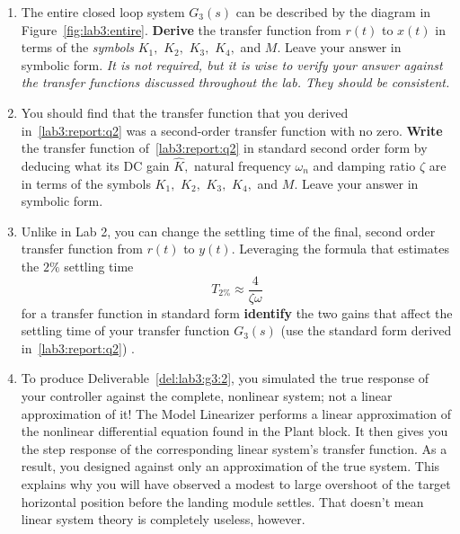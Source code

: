 \begin{deliverable}[label={lab3:report}]
  \begin{enumerate}[label={(\arabic*)}]
    \item{%
      The entire closed loop system \(G_3(s)\) can be described by the diagram in Figure~\ref{fig:lab3:entire}.
      \textbf{Derive} the transfer function from \(r(t)\) to \(x(t)\)
      in terms of the \emph{symbols} \(K_1,\) \(K_2,\) \(K_3,\) \(K_4,\) and \(M.\)
      Leave your answer in symbolic form.
      \emph{It is not required, but it is wise to verify your answer against the transfer functions discussed throughout the lab. They should be consistent.}
      \label{lab3:report:q1}
    }
    \item{%
      You should find that the transfer function that you derived in~\ref{lab3:report:q2} was a second-order transfer function with no zero.
      \textbf{Write} the transfer function of~\ref{lab3:report:q2} in standard second order form by deducing what its DC gain \(\hat{K},\) natural frequency \(\omega_n\) and damping ratio \(\zeta\) are in terms of the symbols \(K_1,\) \(K_2,\) \(K_3,\) \(K_4,\) and \(M.\)
      Leave your answer in symbolic form.
      \label{lab3:report:q2}
    }
    \item{%
      Unlike in Lab 2, you can change the settling time of the final, second order transfer function from \(r(t)\) to \(y(t).\)
      Leveraging the formula that estimates the \(2\%\) settling time
      \[
        T_{2\%} \approx \frac{4}{\zeta \omega}
      \]
      for a transfer function in standard form \textbf{identify} the two gains that affect the settling time of your transfer function \(G_3(s)\) (use the standard form derived in~\ref{lab3:report:q2}) .
      \label{lab3:report:q3}
    }
    \item{%
      To produce Deliverable~\ref{del:lab3:g3:2}, you simulated the true response of your controller against the complete, nonlinear system;
      not a linear approximation of it!
      The Model Linearizer performs a linear approximation of the nonlinear differential equation found in the Plant block.
      It then gives you the step response of the corresponding linear system's transfer function.
      As a result, you designed against only an approximation of the true system.
      This explains why you will have observed a modest to large overshoot of the target horizontal position before the landing module settles.
      That doesn't mean linear system theory is completely useless, however.

}
\end{enumerate}
\end{deliverable}
